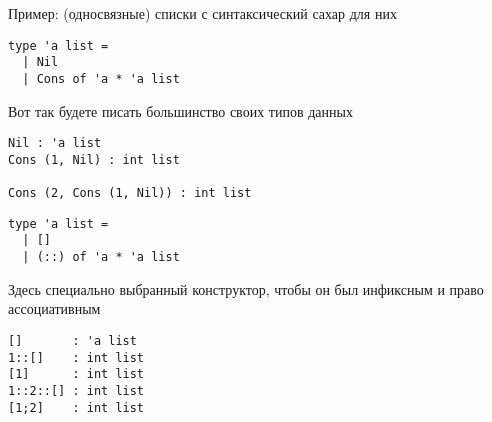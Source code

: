 \documentclass[aspectratio=169
  , xcolor={svgnames}
  , hyperref=
      { colorlinks
      , urlcolor=DarkBlue
      }
  , russian  %
  ]{beamer}
\begin{document}
\begin{frame}[fragile]{Пример: (односвязные) списки с синтаксический сахар для них}
\begin{minipage}[t]{0.45\linewidth}
\begin{verbatim}
type 'a list =
  | Nil
  | Cons of 'a * 'a list
\end{verbatim}
\parbox[][40pt][t]{\linewidth}{
\vspace{1em}
Вот так будете писать большинство своих типов данных
}
\vspace{1em}
\begin{verbatim}
Nil : 'a list
Cons (1, Nil) : int list

Cons (2, Cons (1, Nil)) : int list

\end{verbatim}
\end{minipage}\hspace{1cm}
\begin{minipage}[t]{0.45\linewidth}
\begin{verbatim}
type 'a list =
  | []
  | (::) of 'a * 'a list
\end{verbatim}
\parbox[][40pt][t]{\linewidth}{
\vspace{1em}
Здесь специально выбранный конструктор, чтобы он был инфиксным и право ассоциативным
}
\vspace{1em}
\begin{verbatim}
[]       : 'a list
1::[]    : int list
[1]      : int list
1::2::[] : int list
[1;2]    : int list
\end{verbatim}
\end{minipage}
\end{frame}


\end{document}
